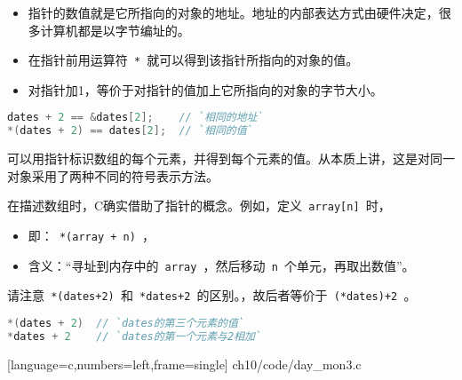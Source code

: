 \begin{frame}[fragile]\ft{\secname}
\begin{center}
\end{center}
\begin{itemize}
\item 
指针的数值就是它所指向的对象的地址。地址的内部表达方式由硬件决定，很多计算机都是以字节编址的。 \\[0.1in]
\item
在指针前用运算符\lstinline| * |就可以得到该指针所指向的对象的值。\\[0.1in]
\item
对指针加1，等价于对指针的值加上它所指向的对象的字节大小。
\end{itemize}
\end{frame}


\begin{frame}[fragile]\ft{\secname}
\begin{lstlisting}[language=c,backgroundcolor=\color{red!20}]
dates + 2 == &dates[2];    // `相同的地址`
*(dates + 2) == dates[2];  // `相同的值`
\end{lstlisting}

可以用指针标识数组的每个元素，并得到每个元素的值。从本质上讲，这是对同一对象采用了两种不同的符号表示方法。

\end{frame}


\begin{frame}[fragile]\ft{\secname}
在描述数组时，C确实借助了指针的概念。例如，定义\lstinline| array[n] |时，\vspace{0.1in}

\begin{itemize}
\item
即：\lstinline| *(array + n) |， \\[0.1in]
\item
含义：“寻址到内存中的\lstinline| array |，然后移动\lstinline| n |个单元，再取出数值”。
\end{itemize}
\end{frame}


\begin{frame}[fragile]\ft{\secname}
请注意\lstinline| *(dates+2) |和\lstinline| *dates+2 |的区别。，故后者等价于\lstinline| (*dates)+2 |。\vspace{0.1in}

\begin{lstlisting}[language=c,backgroundcolor=\color{red!20}]
*(dates + 2)  // `dates的第三个元素的值`
*dates + 2    // `dates的第一个元素与2相加`
\end{lstlisting}
\end{frame}

\begin{frame}[fragile]\ft{\secname}
  
  [language=c,numbers=left,frame=single]  
  {ch10/code/day_mon3.c}
\end{frame}

